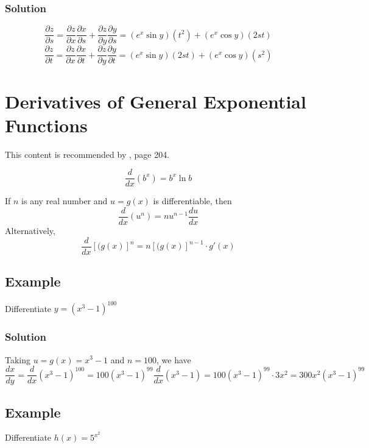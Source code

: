 \subsubsection{Solution}
$$
    \frac{\partial z}{\partial s}=\frac{\partial z}{\partial x}\frac{\partial x}{\partial s} + \frac{\partial z}{\partial y}\frac{\partial y}{\partial s} = (e^x \sin y)(t^2) + (e^x \cos y)(2st)
$$
$$
    \frac{\partial z}{\partial t}=\frac{\partial z}{\partial x}\frac{\partial x}{\partial t} + \frac{\partial z}{\partial y}\frac{\partial y}{\partial t} = (e^x \sin y)(2st) + (e^x \cos y)(s^2)
$$

\section{Derivatives of General Exponential Functions}
This content is recommended by \cite{calculus}, page 204.
\begin{theorem}
\begin{equation}
    \label{eq:11}
    \frac{d}{dx}(b^x)=b^x\ln b
\end{equation}    
\end{theorem}

\begin{theorem}
If $n$ is any real number and $u=g(x)$ is differentiable, then
\begin{equation}
    \label{eq:12}
     \frac{d}{dx}(u^n)=nu^{n-1}\frac{du}{dx}
\end{equation}
Alternatively,
\begin{equation}
    \label{eq:12}
     \frac{d}{dx}[(g(x)]^n=n[(g(x)]^{n-1} \cdot g'(x)
\end{equation}    
\end{theorem}

\subsection{Example}
Differentiate $y=(x^3 - 1)^{100}$
\subsubsection{Solution}
Taking $u=g(x)=x^3 - 1$ and $n=100$, we have
$$
    \frac{dx}{dy}=\frac{d}{dx}(x^3 - 1)^{100}=100(x^3 - 1)^{99}\frac{d}{dx}(x^3 - 1)=100(x^3-1)^{99} \cdot 3x^2=300 x^2(x^3-1)^{99}
$$

\subsection{Example}
Differentiate $h(x)=5^{x^2}$

